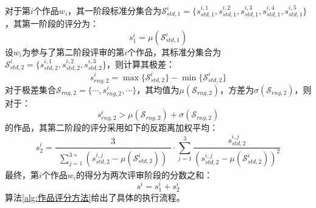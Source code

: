 \documentclass[bwprint]{gmcmthesis}
\begin{document}
		对于第$i$个作品$w_i$，其一阶段标准分集合为$\mathcal{S}^i_{std,1}=\{s^{i,1}_{std,1},s^{i,2}_{std,1},s^{i,3}_{std,1},s^{i,4}_{std,1},s^{i,5}_{std,1}\}$，其第一阶段的评分为：
	\begin{equation}
		s^i_1=\mu\left( \mathcal{S}^i_{std,1}\right) 
	\end{equation}
	设$w_i$为参与了第二阶段评审的第$i$个作品，其标准分集合为$\mathcal{S}^i_{std,2}=\{s^{i,1}_{std,2},s^{i,2}_{std,2},s^{i,3}_{std,2}\}$，则计算其极差：
	\begin{equation}
		s_{rng,2}^i=\max\{\mathcal{S}^i_{std,2}\}-\min\{\mathcal{S}^i_{std,2}\}
	\end{equation}
	对于极差集合$\mathcal{S}_{rng,2}=\{\cdots,s^{i}_{rng,2},\cdots\}$，其均值为$\mu\left( \mathcal{S}_{rng,2}\right) $，方差为$\sigma\left(\mathcal{S}_{rng,2} \right) $，则对于：
	\begin{equation}
		s^i_{rng,2}>\mu\left( \mathcal{S}_{rng,2}\right)+\sigma\left(\mathcal{S}_{rng,2} \right)
	\end{equation}
	的作品，其第二阶段的评分采用如下的反距离加权平均：
	\begin{equation}
		s^i_2=\frac{3}{\begin{aligned}
				\sum_{j=1}^{
					3\times
				}\left( s^{i,j}_{std,2}-\mu\left(\mathcal{S}^i_{std,2} \right)\right) 
		\end{aligned}}
		\cdot\sum_{j=1}^{3}\frac{s^{i,j}_{std,2}}{\left( s^{i,j}_{std,2}-\mu\left(\mathcal{S}^{i}_{std,2} \right) \right) ^2} 
	\end{equation}
	最终，第$i$个作品$w_i$的得分为两次评审阶段的分数之和：
	\begin{equation}
	s^i=s^i_1+s^i_2
	\end{equation}
	算法\ref{alg:作品评分方法}给出了具体的执行流程。
\newpage
\end{document}
